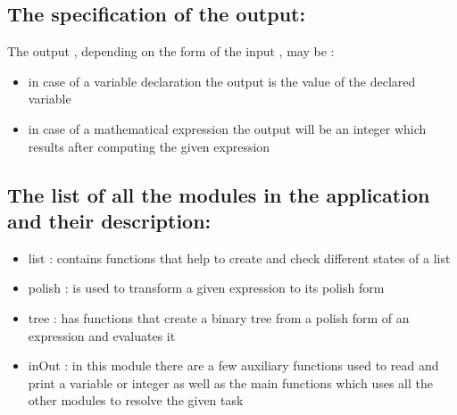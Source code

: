 \documentclass{article}
\begin{document}
\subsection {The specification of the output:}
The output , depending on the form of the input , may be :
	\begin{itemize}
		\item in case of a variable declaration the output is the value of the declared variable
		\item in case of a mathematical expression the output will be an integer which results after computing the given expression 
	\end{itemize}
\subsection {The list of all the modules in the application and their description:}
\begin{itemize} 
	\item list : contains functions that help to create and check different states of a list
	\item polish : is used to transform a given expression to its polish form 
	\item tree : has functions that create a binary tree from a polish form of an expression and evaluates it
	\item inOut : in this module there are a few auxiliary functions used to read and print a variable or integer as well as the main functions which uses all the other modules to resolve the given task
\end{itemize}
\end{document}

